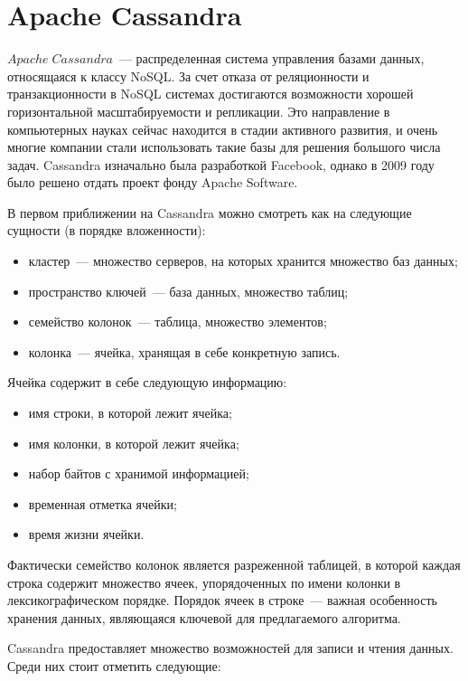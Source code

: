 \section{Apache Cassandra}

$Apache\;Cassandra$~--- распределенная система управления базами данных, относящаяся к классу NoSQL. За счет отказа от реляционности и транзакционности в NoSQL системах достигаются возможности хорошей горизонтальной масштабируемости и репликации. Это направление в компьютерных науках сейчас находится в стадии активного развития, и очень многие компании стали использовать такие базы для решения большого числа задач. Cassandra изначально была разработкой Facebook, однако в 2009 году было решено отдать проект фонду Apache Software.

В первом приближении на Cassandra можно смотреть как на следующие сущности (в порядке вложенности):

\begin{itemize}
	\item кластер~--- множество серверов, на которых хранится множество баз данных;
	\item пространство ключей~--- база данных, множество таблиц;
	\item семейство колонок~--- таблица, множество элементов;
	\item колонка~--- ячейка, хранящая в себе конкретную запись.
\end{itemize}

Ячейка содержит в себе следующую информацию:

\begin{itemize}
	\item имя строки, в которой лежит ячейка;
	\item имя колонки, в которой лежит ячейка;
	\item набор байтов с хранимой информацией;
	\item временная отметка ячейки;
	\item время жизни ячейки.
\end{itemize}

Фактически семейство колонок является разреженной таблицей, в которой каждая строка содержит множество ячеек, упорядоченных по имени колонки в лексикографическом порядке. Порядок ячеек в строке~--- важная особенность хранения данных, являющаяся ключевой для предлагаемого алгоритма.

Cassandra предоставляет множество возможностей для записи и чтения данных. Среди них стоит отметить следующие:

